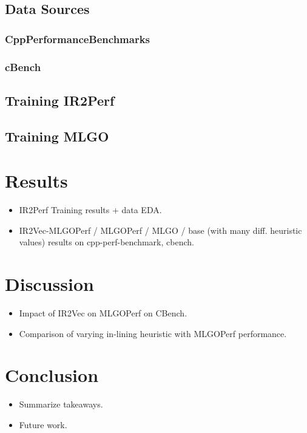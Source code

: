 \documentclass[nohyperref]{article}
\theoremstyle{plain}
\theoremstyle{definition}
\theoremstyle{remark}
\begin{document}
\subsection{Data Sources}
\subsubsection{CppPerformanceBenchmarks}
\subsubsection{cBench}

\subsection{Training IR2Perf}

\subsection{Training MLGO}

\section{Results}
\label{results}
\begin{itemize}
\item IR2Perf Training results + data EDA\@.
\item IR2Vec-MLGOPerf / MLGOPerf / MLGO / base (with many diff. heuristic values) results on cpp-perf-benchmark, cbench\@.
\end{itemize}

\section{Discussion}
\label{discussion}
\begin{itemize}
\item Impact of IR2Vec on MLGOPerf on CBench\@.
\item Comparison of varying in-lining heuristic with MLGOPerf performance\@.
\end{itemize}

\section{Conclusion}
\label{conclusion}
\begin{itemize}
\item Summarize takeaways\@.
\item Future work\@.
\end{itemize}
\end{document}
